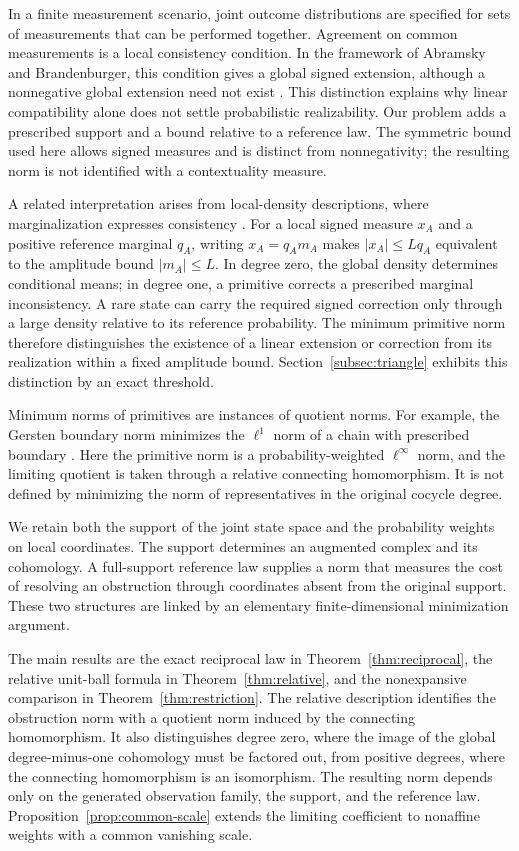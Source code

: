 \documentclass[11pt,a4paper]{article}
\numberwithin{equation}{section}
\theoremstyle{remark}
\begin{document}
In a finite measurement scenario, joint outcome distributions are specified for sets of measurements that can be performed together. Agreement on common measurements is a local consistency condition. In the framework of Abramsky and Brandenburger, this condition gives a global signed extension, although a nonnegative global extension need not exist \cite[Theorems~5.5 and~5.9]{AB}. This distinction explains why linear compatibility alone does not settle probabilistic realizability. Our problem adds a prescribed support and a bound relative to a reference law. The symmetric bound used here allows signed measures and is distinct from nonnegativity; the resulting norm is not identified with a contextuality measure.

A related interpretation arises from local-density descriptions, where marginalization expresses consistency \cite[Definition~7]{Peltre}. For a local signed measure $x_A$ and a positive reference marginal $q_A$, writing $x_A=q_A m_A$ makes $|x_A|\le Lq_A$ equivalent to the amplitude bound $|m_A|\le L$. In degree zero, the global density determines conditional means; in degree one, a primitive corrects a prescribed marginal inconsistency. A rare state can carry the required signed correction only through a large density relative to its reference probability. The minimum primitive norm therefore distinguishes the existence of a linear extension or correction from its realization within a fixed amplitude bound. Section~\ref{subsec:triangle} exhibits this distinction by an exact threshold.

Minimum norms of primitives are instances of quotient norms. For example, the Gersten boundary norm minimizes the $\ell^1$ norm of a chain with prescribed boundary \cite[Definition~2.53 and Remark~2.54]{Calegari}. Here the primitive norm is a probability-weighted $\ell^\infty$ norm, and the limiting quotient is taken through a relative connecting homomorphism. It is not defined by minimizing the norm of representatives in the original cocycle degree.

We retain both the support of the joint state space and the probability weights on local coordinates. The support determines an augmented complex and its cohomology. A full-support reference law supplies a norm that measures the cost of resolving an obstruction through coordinates absent from the original support. These two structures are linked by an elementary finite-dimensional minimization argument.

The main results are the exact reciprocal law in Theorem~\ref{thm:reciprocal}, the relative unit-ball formula in Theorem~\ref{thm:relative}, and the nonexpansive comparison in Theorem~\ref{thm:restriction}. The relative description identifies the obstruction norm with a quotient norm induced by the connecting homomorphism. It also distinguishes degree zero, where the image of the global degree-minus-one cohomology must be factored out, from positive degrees, where the connecting homomorphism is an isomorphism. The resulting norm depends only on the generated observation family, the support, and the reference law. Proposition~\ref{prop:common-scale} extends the limiting coefficient to nonaffine weights with a common vanishing scale.
\end{document}
